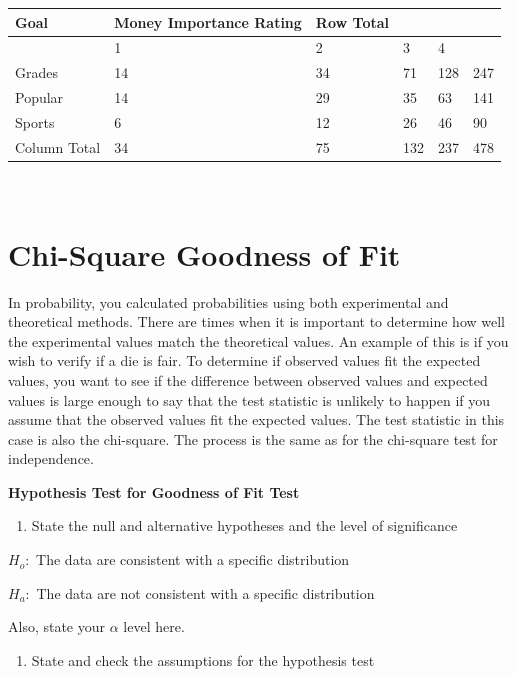 \documentclass[
]{book}
\providecommand{\tightlist}{%
  \setlength{\itemsep}{0pt}\setlength{\parskip}{0pt}}
\begin{document}
\begin{longtable}[]{@{}llllll@{}}
\toprule
Goal & Money Importance Rating & Row Total & & &\tabularnewline
\midrule
\endhead
& 1 & 2 & 3 & 4 &\tabularnewline
Grades & 14 & 34 & 71 & 128 & 247\tabularnewline
Popular & 14 & 29 & 35 & 63 & 141\tabularnewline
Sports & 6 & 12 & 26 & 46 & 90\tabularnewline
Column Total & 34 & 75 & 132 & 237 & 478\tabularnewline
\bottomrule
\end{longtable}

\textbf{\\
}

\hypertarget{chi-square-goodness-of-fit}{%
\section{Chi-Square Goodness of Fit}\label{chi-square-goodness-of-fit}}

In probability, you calculated probabilities using both experimental and theoretical methods. There are times when it is important to determine how well the experimental values match the theoretical values. An example of this is if you wish to verify if a die is fair. To determine if observed values fit the expected values, you want to see if the difference between observed values and expected values is large enough to say that the test statistic is unlikely to happen if you assume that the observed values fit the expected values. The test statistic in this case is also the chi-square. The process is the same as for the chi-square test for independence.

\textbf{Hypothesis Test for Goodness of Fit Test}

\begin{enumerate}
\def\labelenumi{\arabic{enumi}.}
\tightlist
\item
  State the null and alternative hypotheses and the level of significance
\end{enumerate}

\(H_o:\) The data are consistent with a specific distribution

\(H_a:\) The data are not consistent with a specific distribution

Also, state your \(\alpha\) level here.

\begin{enumerate}
\def\labelenumi{\arabic{enumi}.}
\setcounter{enumi}{1}
\tightlist
\item
  State and check the assumptions for the hypothesis test
\end{enumerate}
\end{document}
